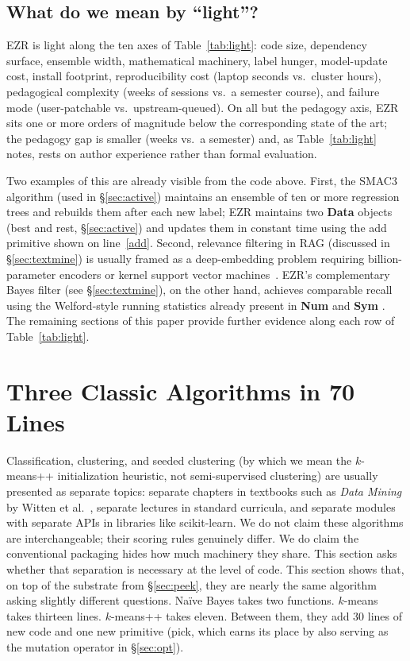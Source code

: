 \documentclass[AMA,STIX2COL]{WileyNJDv5}
\newcommand{\NEW}[1]{\textcolor{newblue}{#1}}
\newcommand{\IT}{{\sffamily EZR}}
\newcommand{\cls}[1]{%
  \setlength{\fboxsep}{1.5pt}%
  \colorbox{clsbg}{\sffamily\bfseries{#1}}%
}
\begin{document}
\subsection{What do we mean by ``light''?}\label{sec:light}

\IT{} is light along the ten axes of Table~\ref{tab:light}:
code size, dependency surface, ensemble width, mathematical
machinery, label hunger, model-update cost, install footprint,
reproducibility cost (laptop seconds vs.\ cluster hours),
pedagogical complexity \NEW{(weeks of sessions vs.\ a semester
course)}, and
failure mode (user-patchable vs.\ upstream-queued). \NEW{On all
but the pedagogy axis, \IT{} sits one or more orders of
magnitude below the corresponding state of the art; the pedagogy
gap is smaller (weeks vs.\ a semester) and, as
Table~\ref{tab:light} notes, rests on author experience rather
than formal evaluation.} 

Two examples of this are already visible from the code above. First,
the SMAC3~\cite{hutter2011sequential} algorithm (used in \S\ref{sec:active})
maintains an ensemble of ten
or more regression trees and rebuilds them after each new label;
\IT{} maintains two \cls{Data} objects (\textsf{best} and
\textsf{rest}, \S\ref{sec:active}) and updates them in constant
time using the \textsf{add} primitive shown on
line~\ref{add}. Second, relevance filtering in RAG (discussed in \S\ref{sec:textmine}) is usually
framed as a deep-embedding problem requiring billion-parameter
encoders or kernel support vector machines~\cite{yu2018total}. 
\IT{}'s complementary Bayes filter
(see \S\ref{sec:textmine}), on the other hand, achieves comparable recall using the
Welford-style running statistics already present in \cls{Num} and
\cls{Sym}. The remaining sections of this paper provide further
evidence along each row of Table~\ref{tab:light}.

\section{Three Classic Algorithms in 70 Lines}\label{sec:famous}

Classification, clustering, and seeded clustering
(by which we mean the $k$-means++ initialization heuristic,
not semi-supervised clustering) are usually
presented as separate topics: separate chapters in textbooks such as
{\em Data Mining} by Witten et al.~\cite{Witten:2005}, separate
lectures in standard curricula, and separate modules with separate
APIs in libraries like scikit-learn. We do not claim these
algorithms are interchangeable; their scoring rules genuinely
differ. We do claim the conventional packaging hides how much
machinery they share. This section asks whether that separation
is necessary at the level of code.
 This section shows that, on top of the
substrate from \S\ref{sec:peek}, they are nearly the same
algorithm asking slightly different questions. Naïve Bayes takes two
functions. $k$-means takes thirteen lines. $k$-means++ takes
eleven. Between them, they add 30 lines of new code and one new
primitive (\textsf{pick}, which earns its place by also serving
as the mutation operator in \S\ref{sec:opt}).
\end{document}
